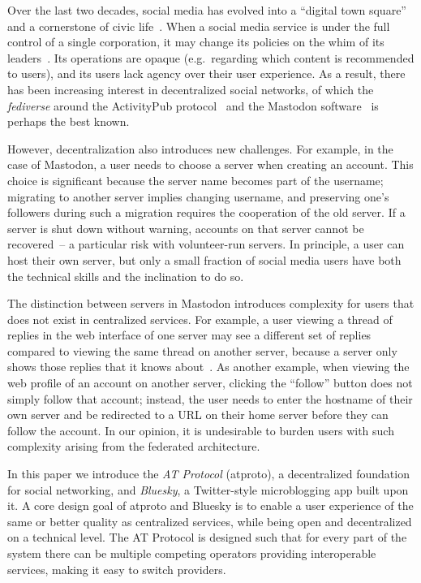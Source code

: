 \documentclass[sigconf]{acmart}
\begin{document}
Over the last two decades, social media has evolved into a ``digital town square'' and a cornerstone of civic life~\cite{Barabas:2017}.
When a social media service is under the full control of a single corporation, it may change its policies on the whim of its leaders~\cite{Yeung:2023}.
Its operations are opaque (e.g.\ regarding which content is recommended to users), and its users lack agency over their user experience.
As a result, there has been increasing interest in decentralized social networks, of which the \emph{fediverse} around the ActivityPub protocol~\cite{ActivityPub} and the Mastodon software~\cite{Mastodon} is perhaps the best known.

However, decentralization also introduces new challenges.
For example, in the case of Mastodon, a user needs to choose a server when creating an account.
This choice is significant because the server name becomes part of the username; migrating to another server implies changing username, and preserving one's followers during such a migration requires the cooperation of the old server.
If a server is shut down without warning, accounts on that server cannot be recovered~-- a particular risk with volunteer-run servers.
In principle, a user can host their own server, but only a small fraction of social media users have both the technical skills and the inclination to do so.

The distinction between servers in Mastodon introduces complexity for users that does not exist in centralized services.
For example, a user viewing a thread of replies in the web interface of one server may see a different set of replies compared to viewing the same thread on another server, because a server only shows those replies that it knows about~\cite{Adida:2022}.
As another example, when viewing the web profile of an account on another server, clicking the ``follow'' button does not simply follow that account; instead, the user needs to enter the hostname of their own server and be redirected to a URL on their home server before they can follow the account.
In our opinion, it is undesirable to burden users with such complexity arising from the federated architecture.

In this paper we introduce the \emph{AT Protocol} (atproto), a decentralized foundation for social networking, and \emph{Bluesky}, a Twitter-style microblogging app built upon it.
A core design goal of atproto and Bluesky is to enable a user experience of the same or better quality as centralized services, while being open and decentralized on a technical level.
The AT Protocol is designed such that for every part of the system there can be multiple competing operators providing interoperable services, making it easy to switch providers.
\end{document}

